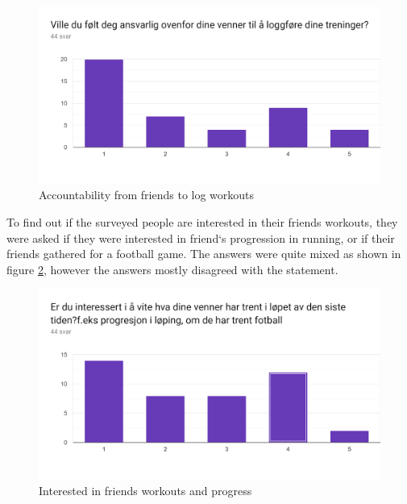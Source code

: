 \begin{figure}[H]
    \centering
    \includegraphics[width=120mm]{figures/AnsvarligLogging.png}
    \caption{Accountability from friends to log workouts}
    \label{acc}
\end{figure}
To find out if the surveyed people are interested in their friends workouts, they were asked if they were interested in friend`s progression in running, or if their friends gathered for a football game. The answers were quite mixed as shown in figure \ref{inti}, however the answers mostly disagreed with the statement. 
\begin{figure}[H]
    \centering
    \includegraphics[width=120mm]{figures/AndresTrening.png}
    \caption{Interested in friends workouts and progress}
    \label{inti}
\end{figure}

